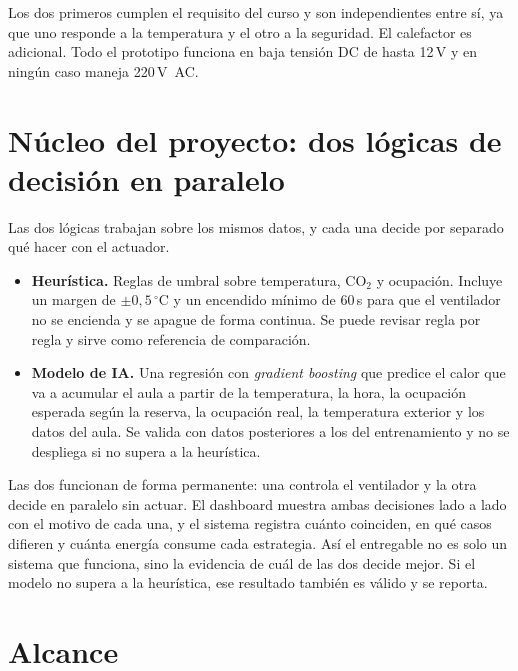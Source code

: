 \documentclass[10pt,a4paper]{article}
\begin{document}
\vspace{3pt}
Los dos primeros cumplen el requisito del curso y son independientes entre sí, ya que uno
responde a la temperatura y el otro a la seguridad. El calefactor es adicional. Todo el
prototipo funciona en baja tensión DC de hasta 12\,V y en ningún caso maneja
\mbox{220\,V AC}.

\section{Núcleo del proyecto: dos lógicas de decisión en paralelo}

Las dos lógicas trabajan sobre los mismos datos, y cada una decide por separado qué hacer
con el actuador.

\begin{itemize}[leftmargin=1.2em,itemsep=1.5pt,topsep=2pt,parsep=0pt]
  \item \textbf{Heurística.} Reglas de umbral sobre temperatura, CO$_2$ y ocupación. Incluye
  un margen de $\pm 0{,}5\,^\circ$C y un encendido mínimo de 60\,s para que el ventilador no
  se encienda y se apague de forma continua. Se puede revisar regla por regla y sirve como
  referencia de comparación.
  \item \textbf{Modelo de IA.} Una regresión con \emph{gradient boosting} que predice el
  calor que va a acumular el aula a partir de la temperatura, la hora, la ocupación esperada
  según la reserva, la ocupación real, la temperatura exterior y los datos del aula. Se
  valida con datos posteriores a los del entrenamiento y no se despliega si no supera a la
  heurística.
\end{itemize}

Las dos funcionan de forma permanente: una controla el ventilador y la otra decide en
paralelo sin actuar. El dashboard muestra ambas decisiones lado a lado con el motivo de cada
una, y el sistema registra cuánto coinciden, en qué casos difieren y cuánta energía consume
cada estrategia. Así el entregable no es solo un sistema que funciona, sino la evidencia de
cuál de las dos decide mejor. Si el modelo no supera a la heurística, ese resultado también
es válido y se reporta.

\section{Alcance}
\end{document}
